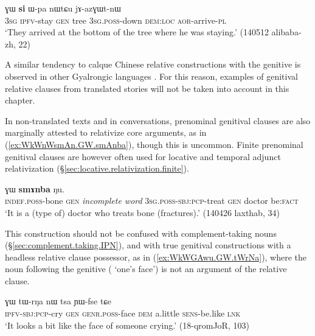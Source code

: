 \begin{exe}
\ex \label{ex:kurAZi.GW.relative}
  ɣɯ \textbf{si} ɯ-pa nɯtɕu jɤ-azɣɯt-nɯ \\
 \textsc{3sg} \textsc{ipfv}-stay \textsc{gen} tree \textsc{3sg}.\textsc{poss}-down \textsc{dem}:\textsc{loc} \textsc{aor}-arrive-\textsc{pl} \\
\glt `They arrived at the bottom of the tree where he was staying.' (140512 alibaba-zh, 22)
\end{exe}
 
A similar tendency to calque Chinese relative constructions with the genitive is observed in other Gyalrongic languages \citep{lai18genitivization}.  For this reason, examples of genitival relative clauses from translated stories will not be taken into account in this chapter. 

In non-translated texts and in conversations, prenominal genitival clauses are also marginally attested to relativize core arguments, as in (\ref{ex:WkWnWsmAn.GW.smAnba}), though this is uncommon. Finite prenominal genitival clauses are however often used for locative and temporal adjunct relativization (§\ref{sec:locative.relativization.finite}).

\begin{exe}
\ex \label{ex:WkWnWsmAn.GW.smAnba}
  ɣɯ \textbf{smɤnba} ŋu. \\
 \textsc{indef}.\textsc{poss}-bone \textsc{gen} \textit{incomplete word} \textsc{3sg}.\textsc{poss}-\textsc{sbj}:\textsc{pcp}-treat \textsc{gen} doctor be:\textsc{fact} \\
 \glt `It is a (type of) doctor who treats bone  (fractures).' (140426 laxthab, 34)
 \end{exe}
  
 This construction should not be confused with complement-taking nouns (§\ref{sec:complement.taking.IPN}), and with true genitival constructions with a headless relative clause possessor, as in (\ref{ex:WkWGAwu.GW.tWrNa}), where the noun following the genitive ( `one's face') is not an argument of the relative clause.
 
\begin{exe}
\ex \label{ex:WkWGAwu.GW.tWrNa}
\gll [ɲɯ-kɯ-ɣɤwu] ɣɯ tɯ-rŋa nɯ tsa ɲɯ-fse tɕe \\
 \textsc{ipfv}-\textsc{sbj}:\textsc{pcp}-cry \textsc{gen} \textsc{genr}.\textsc{poss}-face \textsc{dem} a.little \textsc{sens}-be.like \textsc{lnk} \\
 \glt `It looks a bit like the face of someone crying.' (18-qromJoR, 103)
\end{exe}
  
